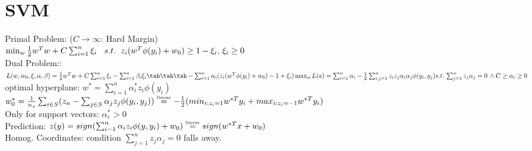 
\section{SVM}
Primal Problem: {\scriptsize ($C \rightarrow \infty$: Hard Margin)}\\
		{\footnotesize $\min_w \frac{1}{2} w^Tw + C \sum_{i=1}^n \xi_i \hspace{3mm}
		s.t. \hspace{2mm} z_i(w^T \phi(y_i) +w_0) \geq 1-\xi_i, \, \xi_i \geq 0$ }\\
Dual Problem:\hspace{1mm}:
    	$L(w,w_0,\xi,\alpha,\beta)=\frac{1}{2}w^Tw + C\sum_{i=1}^n\xi_i - \sum_{i=1}^{n}\beta_i\xi_i \\
        \tab\tab\tab-\sum_{i=1}^{n} \alpha_i(z_i(w^T\phi(y_i) + w_0) -1+\xi_i)\\
		\max_\alpha L(a) = \sum_{i=1}^n\alpha_i - \frac{1}{2} \sum_{i,j=1}^n z_i z_j 
		\alpha_i \alpha_j \phi(y_i, y_j)\\
		s.t. \, \sum_{j=1}^n z_j \alpha_j = 0 \, \wedge C \geq \alpha_i \geq 0 $\\
optimal hyperplane:\mbox{}  $w^* = \sum_{i=1}^n \alpha_i^* z_i \phi(y_i)$ \\
    $w_0^* = \frac{1}{n_s} \sum_{i \in S}(z_n - \sum_{j \in S} \alpha_j z_j \phi(y_i,y_j))\\
    		\stackrel{\text{\tiny linear}}{=} -\frac{1}{2}(min_{i:z_i=1} w^{*T}y_i 
            									+ max_{i:z_i=-1} w^{*T}y_i)$\\
Only for support vectors:\mbox{} $\alpha_i^* > 0$\\
Prediction:\mbox{} 
		$z(y)=sign(\sum_{i=1}^n \alpha_i z_i \phi(y,y_i) + w_0) \\
        \stackrel{\text{\tiny linear}}{=} sign(w^{*T}x+w_0)$\\
Homog. Coordinates:\mbox{}  condition $\sum_{j=1}^n z_j \alpha_j = 0$ falls away.


